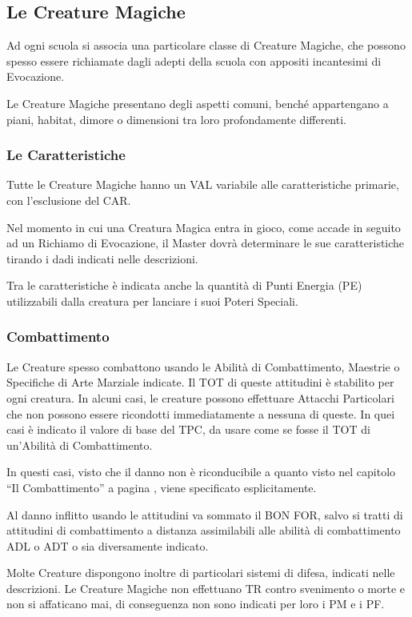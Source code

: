 \subsection{Le Creature Magiche} 

Ad ogni scuola si associa una particolare classe di Creature Magiche,
che possono spesso essere richiamate dagli adepti della scuola con
appositi incantesimi di Evocazione.

Le Creature Magiche presentano degli aspetti comuni, bench\'e
appartengano a piani, habitat, dimore o dimensioni tra loro
profondamente differenti.

\subsubsection{Le Caratteristiche} Tutte le Creature Magiche
hanno un VAL variabile alle caratteristiche primarie, con l'esclusione del CAR.

Nel momento in cui una Creatura Magica entra in gioco, come accade in seguito
ad un Richiamo di Evocazione, il Master dovr\`a determinare le sue caratteristiche
tirando i dadi indicati nelle descrizioni.

Tra le caratteristiche \`e indicata anche la quantit\`a di Punti
Energia (PE) utilizzabili dalla creatura per lanciare i suoi Poteri
Speciali.

\subsubsection{Combattimento}

Le Creature spesso combattono usando le Abilit\`a di Combattimento,
Maestrie o Specifiche di Arte Marziale indicate.  Il TOT di queste
attitudini \`e stabilito per ogni creatura. In alcuni casi, le
creature possono effettuare Attacchi Particolari che non possono
essere ricondotti immediatamente a nessuna di queste. In quei casi \`e
indicato il valore di base del TPC, da usare come se fosse il TOT di
un'Abilit\`a di Combattimento.

In questi casi, visto che il danno non \`e riconducibile a quanto
visto nel capitolo ``Il Combattimento'' a pagina
\pageref{combattimento}, viene specificato esplicitamente.

Al danno inflitto usando le attitudini va sommato il BON FOR, salvo si
tratti di attitudini di combattimento a distanza assimilabili alle
abilit\`a di combattimento ADL o ADT o sia diversamente indicato.

Molte Creature dispongono inoltre di particolari sistemi di difesa,
indicati nelle descrizioni. Le Creature Magiche non effettuano TR
contro svenimento o morte e non si affaticano mai, di conseguenza non
sono indicati per loro i PM e i PF.

